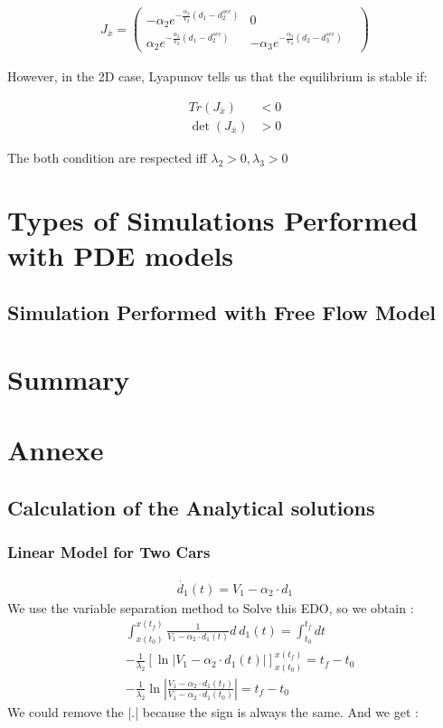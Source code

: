 \documentclass{article}
\begin{document}
	\begin{align*}
		J_{\bar{x}}=\begin{pmatrix}
			-\alpha_2e^{-\frac{\alpha_2}{V_2}(d_1 - d_{2}^{sec})} & 0 & \\
			\alpha_2e^{-\frac{\alpha_2}{V_2}(d_1 - d_{2}^{sec})} & -\alpha_3e^{-\frac{\alpha_3}{V_3}(d_2 - d_{3}^{sec})} &
		\end{pmatrix}
	\end{align*}
	
	However, in the 2D case, Lyapunov tells us that the equilibrium is stable if:
	
	\[
	\boxed{
		\begin{aligned}
			Tr(J_{\bar{x}}) &< 0 \\
			\det(J_{\bar{x}}) &> 0
		\end{aligned}
	}
	\]

	The both condition are respected iff $\lambda_2>0, \lambda_3>0$
	
	\section{Types of Simulations Performed with PDE models}
	
	
	\subsection{Simulation Performed with Free Flow Model}

	
	\section{Summary}
	
	\section{Annexe}
	
	\subsection{Calculation of the Analytical solutions}
	
	\subsubsection{Linear Model for Two Cars}
	
	\label{eq:EDO1}
	\begin{align*} 
		\dot{d_1}(t) = V_1 - \alpha_2 \cdot d_1
	\end{align*}
	We use the variable separation method to Solve this EDO, so we obtain : 
	\begin{align*} 
		&\int_{x(t_0)}^{x(t_f)} \frac{1}{V_1 - \alpha_2 \cdot d_1(t)} d \ d_1(t) = \int_{t_0}^{t_f} dt \\
		&-\frac{1}{\lambda_2} \left[ \ln\left| V_1 - \alpha_2 \cdot d_1(t) \right| \right]_{x(t_0)}^{x(t_f)} = t_f-t_0 \\
		&-\frac{1}{\lambda_2} \ln\left| \frac{V_1 - \alpha_2 \cdot d_1(t_f)}{V_1 - \alpha_2 \cdot d_1(t_0)} \right| = t_f-t_0
	\end{align*}
	We could remove the |.| because the sign is always the same. And we get : 
	
\end{document}
